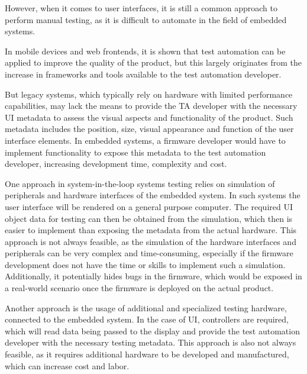 \documentclass[Proposal,BIC,english,IEEE]{BASE/twbook} %
\begin{document}
However, when it comes to user interfaces, it is still a common approach to perform manual testing, as it is difficult to automate in the field of embedded systems.

In mobile devices and web frontends, it is shown that test automation can be applied to improve the quality of the product, but this largely originates from the increase in frameworks and tools available to the test automation developer.

But legacy systems, which typically rely on hardware with limited performance capabilities, may lack the means to provide the TA developer with the necessary UI metadata to assess the visual aspects and functionality of the product. Such metadata includes the position, size, visual appearance and function of the user interface elements. In embedded systems, a firmware developer would have to implement functionality to expose this metadata to the test automation developer, increasing development time, complexity and cost.

One approach in system-in-the-loop systems testing relies on simulation of peripherals and hardware interfaces of the embedded system. In such systems the user interface will be rendered on a general purpose computer. The required UI object data for testing can then be obtained from the simulation, which then is easier to implement than exposing the metadata from the actual hardware.
This approach is not always feasible, as the simulation of the hardware interfaces and peripherals can be very complex and time-consuming, especially if the firmware development does not have the time or skills to implement such a simulation. Additionally, it potentially hides bugs in the firmware, which would be exposed in a real-world scenario once the firmware is deployed on the actual product.

Another approach is the usage of additional and specialized testing hardware, connected to the embedded system. In the case of UI, controllers are required, which will read data being passed to the display and provide the test automation developer with the necessary testing metadata. This approach is also not always feasible, as it requires additional hardware to be developed and manufactured, which can increase cost and labor.
\end{document}
